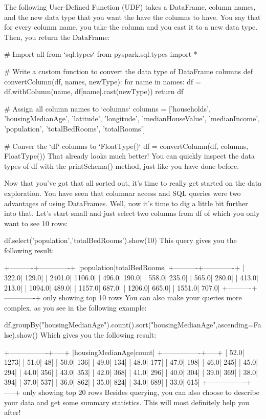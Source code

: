 \documentclass[a4paper,12pt]{article}
\begin{document}
The following User-Defined Function (UDF) takes a DataFrame, column names, and the new data type that you want the have the columns to have. You say that for every column name, you take the column and you cast it to a new data type. Then, you return the DataFrame:

# Import all from `sql.types`
from pyspark.sql.types import *

# Write a custom function to convert the data type of DataFrame columns
def convertColumn(df, names, newType):
  for name in names: 
     df = df.withColumn(name, df[name].cast(newType))
  return df 

# Assign all column names to `columns`
columns = ['households', 'housingMedianAge', 'latitude', 'longitude', 'medianHouseValue', 'medianIncome', 'population', 'totalBedRooms', 'totalRooms']

# Conver the `df` columns to `FloatType()`
df = convertColumn(df, columns, FloatType())
That already looks much better! You can quickly inspect the data types of df with the printSchema() method, just like you have done before.

Now that you’ve got that all sorted out, it’s time to really get started on the data exploration. You have seen that columnar access and SQL queries were two advantages of using DataFrames. Well, now it’s time to dig a little bit further into that. Let’s start small and just select two columns from df of which you only want to see 10 rows:

df.select('population','totalBedRooms').show(10)
This query gives you the following result:

+----------+-------------+
|population|totalBedRooms|
+----------+-------------+
|     322.0|        129.0|
|    2401.0|       1106.0|
|     496.0|        190.0|
|     558.0|        235.0|
|     565.0|        280.0|
|     413.0|        213.0|
|    1094.0|        489.0|
|    1157.0|        687.0|
|    1206.0|        665.0|
|    1551.0|        707.0|
+----------+-------------+
only showing top 10 rows
You can also make your queries more complex, as you see in the following example:

df.groupBy("housingMedianAge").count().sort("housingMedianAge",ascending=False).show()
Which gives you the following result:

+----------------+-----+                                                        
|housingMedianAge|count|
+----------------+-----+
|            52.0| 1273|
|            51.0|   48|
|            50.0|  136|
|            49.0|  134|
|            48.0|  177|
|            47.0|  198|
|            46.0|  245|
|            45.0|  294|
|            44.0|  356|
|            43.0|  353|
|            42.0|  368|
|            41.0|  296|
|            40.0|  304|
|            39.0|  369|
|            38.0|  394|
|            37.0|  537|
|            36.0|  862|
|            35.0|  824|
|            34.0|  689|
|            33.0|  615|
+----------------+-----+
only showing top 20 rows
Besides querying, you can also choose to describe your data and get some summary statistics. This will most definitely help you after!
\end{document}
